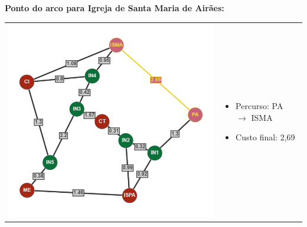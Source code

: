 \documentclass[12pt]{article}
\begin{document}
    \noindent \textbf{Ponto do arco para Igreja de Santa Maria de Airães:}\\
    \begin{tabular}{@{}m{}m{}@{}}
      \centering\includegraphics[scale=0.4]{anexos/PA-ISMA.png} &
      \begin{itemize}
        \item Percurso: PA $\rightarrow$ ISMA
        \item Custo final: 2,69
      \end{itemize}
    \end{tabular} 
    
\end{document}
